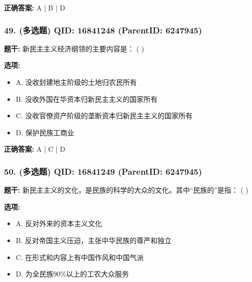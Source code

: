 \documentclass[12pt,UTF8]{ctexart}
\begin{document}
\textbf{正确答案:}
A | B | D

\vspace{0.3em}\hrulefill\vspace{0.7em}

\subsubsection*{49. (多选题) \small QID: 16841248 (ParentID: 6247945)}

\textbf{题干:}
新民主主义经济纲领的主要内容是： ( )



\textbf{选项:}
\begin{itemize}[leftmargin=*]

  \item A. 没收封建地主阶级的土地归农民所有

  \item B. 没收外国在华资本归新民主主义的国家所有

  \item C. 没收官僚资产阶级的垄断资本归新民主主义的国家所有

  \item D. 保护民族工商业

\end{itemize}

\textbf{正确答案:}
A | C | D

\vspace{0.3em}\hrulefill\vspace{0.7em}

\subsubsection*{50. (多选题) \small QID: 16841249 (ParentID: 6247945)}

\textbf{题干:}
新民主主义的文化，是民族的科学的大众的文化。其中“民族的”是指： ( )



\textbf{选项:}
\begin{itemize}[leftmargin=*]

  \item A. 反对外来的资本主义文化

  \item B. 反对帝国主义压迫，主张中华民族的尊严和独立

  \item C. 在形式和内容上有中国作风和中国气派

  \item D. 为全民族90\%以上的工农大众服务

\end{itemize}
\end{document}
